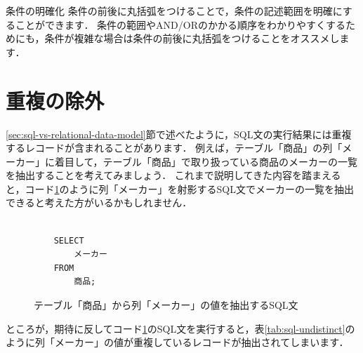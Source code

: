 \begin{tipbox}{条件の明確化}
    条件の前後に丸括弧をつけることで，条件の記述範囲を明確にすることができます．
    条件の範囲やAND/ORのかかる順序をわかりやすくするためにも，条件が複雑な場合は条件の前後に丸括弧をつけることをオススメします．
\end{tipbox}

\section{重複の除外}
\ref{sec:sql-vs-relational-data-model}節で述べたように，SQL文の実行結果には重複するレコードが含まれることがあります．
例えば，テーブル「商品」の列「メーカー」に着目して，テーブル「商品」で取り扱っている商品のメーカーの一覧を抽出することを考えてみましょう．
これまで説明してきた内容を踏まえると，コード\ref{code:sql-undistinct}のように列「メーカー」を射影するSQL文でメーカーの一覧を抽出できると考えた方がいるかもしれません．
\begin{figure}[!htbp]
    \begin{verbatim}

    SELECT
        メーカー
    FROM
        商品;

    \end{verbatim}
    \captionsetup{name=コード}
    \caption{テーブル「商品」から列「メーカー」の値を抽出するSQL文}
    \label{code:sql-undistinct}
\end{figure}
ところが，期待に反してコード\ref{code:sql-undistinct}のSQL文を実行すると，表\ref{tab:sql-undistinct}のように列「メーカー」の値が重複しているレコードが抽出されてしまいます．
\begin{table}[!htbp]
    \centering
    \caption{テーブル「商品」から列「メーカー」の値を抽出した結果}
    \label{tab:sql-undistinct}
\end{table}

